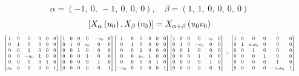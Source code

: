 \documentclass[11pt]{article}
\theoremstyle{definition}
\begin{document}
\[
\alpha = \left( -1, \  0, \  -1, \  0, \  0, \  0\right), \quad \beta = \left( 1, \  1, \  0, \  0, \  0, \  0\right)
\]
\[
\scaletoalign{\textwidth}{\left[ X_{\alpha}\left(u_{0}\right), X_{\beta}\left(v_{0}\right) \right] = X_{\alpha + \beta}\left(u_{0} v_{0}\right)}
\]
\[
\scaletoalign{\textwidth}{{\left[\begin{matrix}1 & 0 & 0 & 0 & 0 & 0\\0 & 1 & 0 & 0 & 0 & 0\\0 & 0 & 1 & 0 & 0 & 0\\0 & 0 & - u_{0} & 1 & 0 & 0\\0 & 0 & 0 & 0 & 1 & 0\\u_{0} & 0 & 0 & 0 & 0 & 1\end{matrix}\right]} {\left[\begin{matrix}1 & 0 & 0 & 0 & - v_{0} & 0\\0 & 1 & 0 & v_{0} & 0 & 0\\0 & 0 & 1 & 0 & 0 & 0\\0 & 0 & 0 & 1 & 0 & 0\\0 & 0 & 0 & 0 & 1 & 0\\0 & 0 & 0 & 0 & 0 & 1\end{matrix}\right]} {\left[\begin{matrix}1 & 0 & 0 & 0 & 0 & 0\\0 & 1 & 0 & 0 & 0 & 0\\0 & 0 & 1 & 0 & 0 & 0\\0 & 0 & u_{0} & 1 & 0 & 0\\0 & 0 & 0 & 0 & 1 & 0\\- u_{0} & 0 & 0 & 0 & 0 & 1\end{matrix}\right]} {\left[\begin{matrix}1 & 0 & 0 & 0 & v_{0} & 0\\0 & 1 & 0 & - v_{0} & 0 & 0\\0 & 0 & 1 & 0 & 0 & 0\\0 & 0 & 0 & 1 & 0 & 0\\0 & 0 & 0 & 0 & 1 & 0\\0 & 0 & 0 & 0 & 0 & 1\end{matrix}\right]} = {\left[\begin{matrix}1 & 0 & 0 & 0 & 0 & 0\\0 & 1 & u_{0} v_{0} & 0 & 0 & 0\\0 & 0 & 1 & 0 & 0 & 0\\0 & 0 & 0 & 1 & 0 & 0\\0 & 0 & 0 & 0 & 1 & 0\\0 & 0 & 0 & 0 & - u_{0} v_{0} & 1\end{matrix}\right]}}
\]
\end{document}
